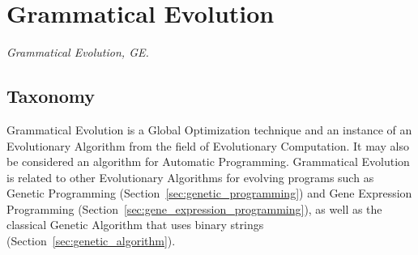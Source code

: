 

\section{Grammatical Evolution} 
\label{sec:grammatical_evolution}

\emph{Grammatical Evolution, GE.}

\subsection{Taxonomy}
Grammatical Evolution is a Global Optimization technique and an instance of an Evolutionary Algorithm from the field of Evolutionary Computation. It may also be considered an algorithm for Automatic Programming.
Grammatical Evolution is related to other Evolutionary Algorithms for evolving programs such as Genetic Programming (Section~\ref{sec:genetic_programming}) and Gene Expression Programming (Section~\ref{sec:gene_expression_programming}), as well as the classical Genetic Algorithm that uses binary strings (Section~\ref{sec:genetic_algorithm}).

